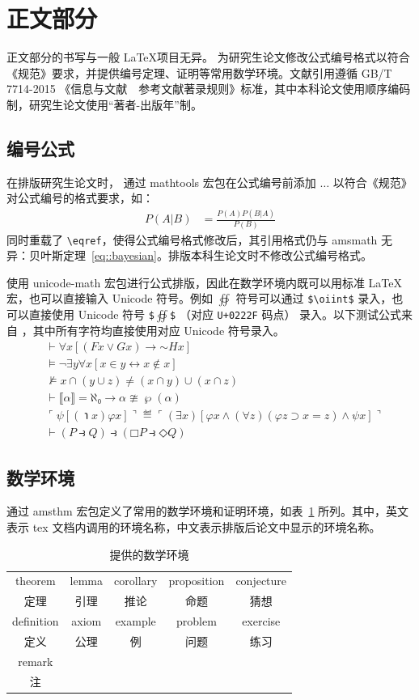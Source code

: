 \documentclass[master]{shtthesis}
\begin{document}
\section{正文部分}
\shtthesis{} 正文部分的书写与一般 \LaTeX 项目无异。\shtthesis{} 为研究生论文修改公式编号格式以符合《规范》要求，并提供编号定理、证明等常用数学环境。文献引用遵循 GB/T 7714-2015 《信息与文献　参考文献著录规则》标准，其中本科论文使用顺序编码制，研究生论文使用“著者-出版年”制。

\subsection{编号公式}
在排版研究生论文时，\shtthesis{} 通过 \textsf{mathtools} 宏包在公式编号前添加 $\ldots$ 以符合《规范》对公式编号的格式要求，如：
\begin{align}
P(A|B) &= \frac{P(A)P(B|A)}{P(B)} \label{eq::bayesian}
\end{align}
同时重载了 \verb|\eqref|，使得公式编号格式修改后，其引用格式仍与 \textsf{amsmath} 无异：贝叶斯定理~\eqref{eq::bayesian}。排版本科生论文时不修改公式编号格式。

\shtthesis{} 使用 \textsf{unicode-math} 宏包进行公式排版，因此在数学环境内既可以用标准 \LaTeX{} 宏，也可以直接输入 Unicode 符号。例如 $\oiint$ 符号可以通过 \verb|$\oiint$| 录入，也可以直接使用 Unicode 符号 \verb|$|$∯$\verb|$| （对应 \verb|U+0222F| 码点） 录入。以下测试公式来自 \citet{clerkma2013unicode}，其中所有字符均直接使用对应 Unicode 符号录入。
\begin{align}
& ⊢ ∀x[(Fx ∨ Gx) → \mathord{∼}Hx] \\
& ⊨ ¬∃y∀x[x∈y ↔ x∉x]  \\
& ⊭ x ∩ (y ∪ z) ≠ (x ∩ y) ∪ (x ∩ z) \\
& ⊢ ⟦α⟧ = ℵ₀ → α ≇ ℘(α) \\
& ⌜ψ[(℩x)φx]⌝ ≝ ⌜(∃x)[φx ∧ (∀z)(φz ⊃ x=z) ∧ ψx]⌝ \\
& ⊢ (P ⥽ Q) ⥽ (□P ⥽ ◇Q)
\end{align}

\subsection{数学环境}
\shtthesis 通过 \textsf{amsthm} 宏包定义了常用的数学环境和证明环境，如表~\ref{tab::math_envs} 所列。其中，英文表示 tex 文档内调用的环境名称，中文表示排版后论文中显示的环境名称。

\begin{table}[htb]
\centering
\caption{\shtthesis 提供的数学环境}
\label{tab::math_envs}
\begin{tabular}{*{5}{c}}
  \toprule
  theorem & lemma & corollary & proposition & conjecture \\
  定理    & 引理  & 推论       & 命题        & 猜想       \\
  \midrule
  definition & axiom & example & problem & exercise \\
  定义       & 公理  & 例       & 问题    & 练习     \\
  \midrule
  remark & & & & \\
  注 & & & & \\
  \bottomrule
\end{tabular}
\end{table}
\end{document}
